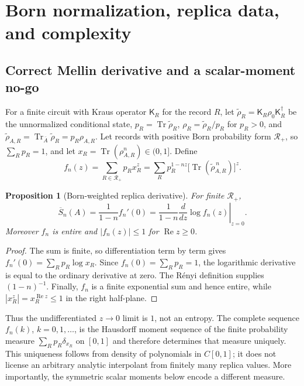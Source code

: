 \documentclass[aps,prx,reprint,superscriptaddress,nobibnotes,longbibliography]{revtex4-2}
\newtheorem{proposition}{Proposition}
\theoremstyle{remark}
\newcommand{\Tr}{\operatorname{Tr}}
\begin{document}
\section{Born normalization, replica data, and complexity}
\label{sec:born}

\subsection{Correct Mellin derivative and a scalar-moment no-go}

For a finite circuit with Kraus operator $\mathsf K_R$ for the record $R$, let $\tilde\rho_R=\mathsf K_R\rho_0\mathsf K_R^\dagger$ be the unnormalized conditional state, $p_R=\Tr\tilde\rho_R$, $\rho_R=\tilde\rho_R/p_R$ for $p_R>0$, and $\tilde\rho_{A,R}=\Tr_{\bar A}\tilde\rho_R=p_R\rho_{A,R}$.  Let records with positive Born probability form $\mathcal R_+$, so $\sum_Rp_R=1$, and let
$x_R=\Tr(\rho_{A,R}^n)\in(0,1]$.  Define
\begin{equation}
 f_n(z)=\sum_{R\in\mathcal R_+}p_Rx_R^z
 =\sum_Rp_R^{1-nz}\bigl[\Tr(\tilde\rho_{A,R}^{\,n})\bigr]^z.
 \label{eq:Mellin}
\end{equation}

\begin{proposition}[Born-weighted replica derivative]
\label{prop:replica-derivative}
For finite $\mathcal R_+$,
\begin{equation}
 \overline S_n(A)=\frac1{1-n}f_n'(0)
 =\frac1{1-n}\left.\frac{d}{dz}\log f_n(z)\right|_{z=0}.
 \label{eq:replicaderiv}
\end{equation}
Moreover $f_n$ is entire and $|f_n(z)|\le1$ for $\operatorname{Re}z\ge0$.
\end{proposition}

\begin{proof}
The sum is finite, so differentiation term by term gives
$f_n'(0)=\sum_Rp_R\log x_R$.  Since $f_n(0)=\sum_Rp_R=1$, the logarithmic derivative is equal to the ordinary derivative at zero.  The R\'enyi definition supplies $(1-n)^{-1}$.  Finally, $f_n$ is a finite exponential sum and hence entire, while $|x_R^z|=x_R^{\operatorname{Re}z}\le1$ in the right half-plane.
\end{proof}

Thus the undifferentiated $z\to0$ limit is $1$, not an entropy.  The complete sequence $f_n(k)$, $k=0,1,\ldots$, is the Hausdorff moment sequence of the finite probability measure $\sum_Rp_R\delta_{x_R}$ on $[0,1]$ and therefore determines that measure uniquely.  This uniqueness follows from density of polynomials in $C[0,1]$; it does not license an arbitrary analytic interpolant from finitely many replica values.  More importantly, the symmetric scalar moments below encode a different measure.
\end{document}
